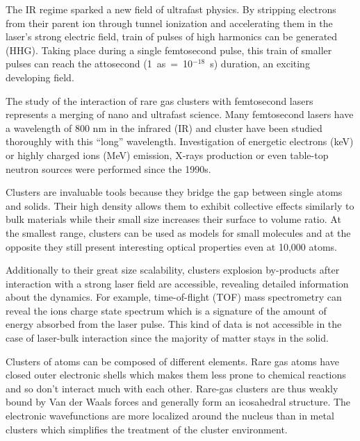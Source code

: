 The IR regime sparked a new field of ultrafast physics. By stripping electrons
from their parent ion through tunnel ionization and accelerating them in the
laser's strong electric field, train of pulses of high harmonics can be generated (HHG).
Taking place during a single femtosecond pulse, this train of smaller pulses
can reach the attosecond \mbox{(1 as = 10$^{-18}$ s)} duration, an exciting developing field.





The study of the interaction of rare gas clusters with femtosecond lasers represents a
merging of nano and ultrafast science.
%
Many femtosecond lasers
have a wavelength of 800 nm in the infrared (IR) and cluster have been studied
thoroughly with this ``long'' wavelength. Investigation of energetic
electrons (keV) or highly charged ions (MeV) emission, X-rays production or even
table-top neutron sources\cite{Krainov2007} were performed since the
1990s\cite{Haberland1994,Brabec2009}.

Clusters are invaluable tools because they bridge the gap between single atoms
and solids. Their high density allows them to exhibit collective effects similarly
to bulk materials while their small
size increases their surface to volume ratio.
At the smallest range, clusters can be used as models for small molecules and
at the opposite they still present interesting optical properties even at 10,000
atoms\cite{Reinhard2004}.

Additionally to their great size scalability, clusters explosion by-products
after interaction with a strong laser field are accessible, revealing detailed
information about the dynamics. For example, time-of-flight (TOF) mass
spectrometry can reveal the ions charge state spectrum which
is a signature of the amount
of energy absorbed from the laser pulse. This kind of data is not accessible
in the case of laser-bulk interaction since the majority of matter stays
in the solid.

Clusters of atoms can be composed of different elements. Rare gas atoms have
closed outer electronic shells which makes them less prone to chemical
reactions and so don't interact much with each other. Rare-gas clusters are
thus weakly bound by Van der Waals forces and generally form
an icosahedral structure\cite{Martin1996}. The electronic wavefunctions are
more localized around the nucleus than in metal clusters which simplifies the
treatment of the cluster environment.

